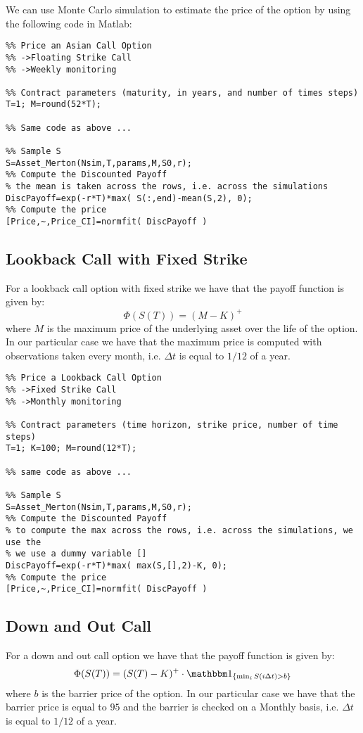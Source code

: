 We can use Monte Carlo simulation to estimate the price of the option by
using the following code in Matlab:

\begin{verbatim}
%% Price an Asian Call Option
%% ->Floating Strike Call
%% ->Weekly monitoring

%% Contract parameters (maturity, in years, and number of times steps)
T=1; M=round(52*T);

%% Same code as above ...

%% Sample S
S=Asset_Merton(Nsim,T,params,M,S0,r);
%% Compute the Discounted Payoff
% the mean is taken across the rows, i.e. across the simulations
DiscPayoff=exp(-r*T)*max( S(:,end)-mean(S,2), 0);
%% Compute the price
[Price,~,Price_CI]=normfit( DiscPayoff )
\end{verbatim}

\subsection{Lookback Call with Fixed Strike}
For a lookback call option with fixed strike we have that the payoff function
is given by:
\[ \Phi(S(T)) = (M - K)^+ \]
where $M$ is the maximum price of the underlying asset over the life of the
option. In our particular case we have that the maximum price is computed with
observations taken every month, i.e. $\Delta t$ is equal to $1/12$ of a year.

\begin{verbatim}
%% Price a Lookback Call Option
%% ->Fixed Strike Call
%% ->Monthly monitoring

%% Contract parameters (time horizon, strike price, number of time steps)
T=1; K=100; M=round(12*T);

%% same code as above ...

%% Sample S
S=Asset_Merton(Nsim,T,params,M,S0,r);
%% Compute the Discounted Payoff
% to compute the max across the rows, i.e. across the simulations, we use the
% we use a dummy variable []
DiscPayoff=exp(-r*T)*max( max(S,[],2)-K, 0);
%% Compute the price
[Price,~,Price_CI]=normfit( DiscPayoff )
\end{verbatim}

\subsection{Down and Out Call}
For a down and out call option we have that the payoff function is given by:
\[ \Phi(S(T)) = (S(T) - K)^+ \cdot \I_{\{ \min_i S(i\Delta t) > b \}} \]
where $b$ is the barrier price of the option. In our particular case we have
that the barrier price is equal to $95$ and the barrier is checked on a Monthly
basis, i.e. $\Delta t$ is equal to $1/12$ of a year.

